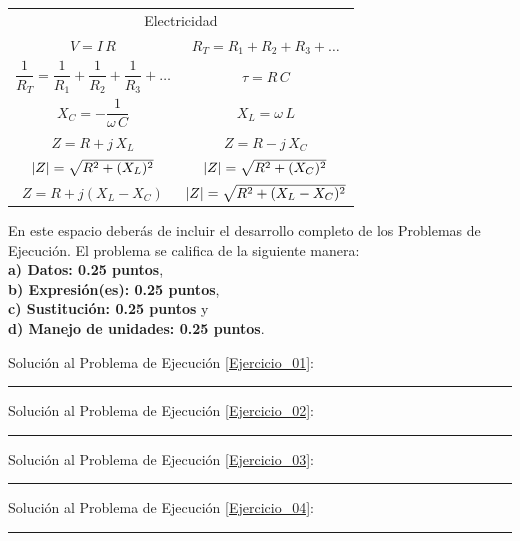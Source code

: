 \documentclass[12pt]{exam}
\begin{document}
\newpage

\begin{table}[H]
    \centering
    \setlength{\tabcolsep}{40pt}
    \renewcommand{\arraystretch}{2.5}
    \begin{tabular}{c  c}
        \multicolumn{2}{c}{Electricidad} \\
        $V = I \, R$ & $R_{T} = R_{1} + R_{2} + R_{3} + \ldots$ \\
        $\dfrac{1}{R_{T}} = \dfrac{1}{R_{1}} + \dfrac{1}{R_{2}} + \dfrac{1}{R_{3}} + \ldots$ & $\tau = R \, C$ \\
        $X_{C} = - \dfrac{1}{\omega \, C}$ & $X_{L} = \omega\, L$ \\
        $Z = R + j \, X_{L}$ & $Z = R - j \, X_{C}$ \\
        $\abs{Z} = \sqrt{R^{2} + (X_{L})^{2}}$ & $\abs{Z} = \sqrt{R^{2} + (X_{C})^{2}}$ \\
        $Z = R + j (X_{L} - X_{C})$ & $\abs{Z} = \sqrt{R^{2} + (X_{L} - X_{C})^{2}}$
\end{tabular}
\end{table}

\newpage

En este espacio deberás de incluir el desarrollo completo de los Problemas de Ejecución. El problema se califica de la siguiente manera: \\
\textbf{a) Datos: 0.25 puntos}, \\
\textbf{b) Expresión(es): 0.25 puntos}, \\
\textbf{c) Sustitución: 0.25 puntos} y \\
\textbf{d) Manejo de unidades: 0.25 puntos}.

\vspace*{0.5cm}
Solución al Problema de Ejecución \ref{Ejercicio_01}:

\vspace*{4cm}
\rule{0.9\textwidth}{0.1mm}

Solución al Problema de Ejecución \ref{Ejercicio_02}:

\vspace*{4.5cm}
\rule{0.9\textwidth}{0.1mm}

Solución al Problema de Ejecución \ref{Ejercicio_03}:

\vspace*{4.5cm}
\rule{0.9\textwidth}{0.1mm}

Solución al Problema de Ejecución \ref{Ejercicio_04}:

\vspace*{4.5cm}
\rule{0.9\textwidth}{0.1mm}
\end{document}
